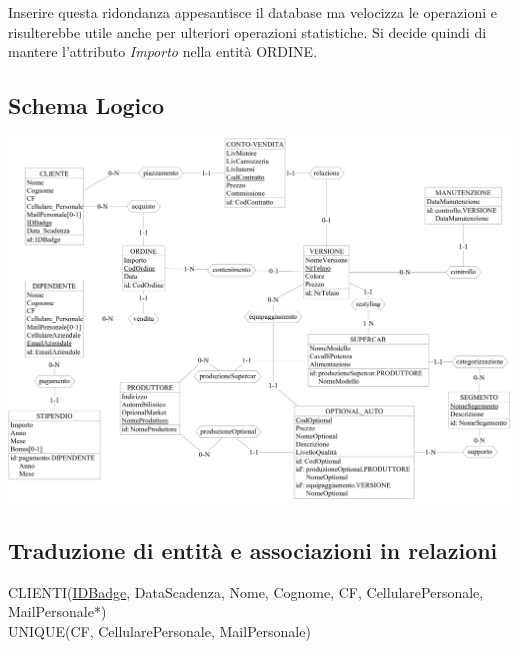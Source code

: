 \documentclass[11pt]{article}
\begin{document}
Inserire questa ridondanza appesantisce il database ma velocizza le operazioni e
risulterebbe utile anche per ulteriori operazioni statistiche. 
Si decide quindi di mantere l'attributo \textit{Importo} nella entità ORDINE.

\newpage

\subsection{Schema Logico}

\begin{center}
    \includegraphics[height=\linewidth, angle=90]{images/fullSchemes/logico.jpeg}
\end{center}

\newpage

\subsection{Traduzione di entità e associazioni in relazioni}

\small

\begin{flushleft}
CLIENTI(\underline{IDBadge}, DataScadenza, Nome, Cognome, CF,
    CellularePersonale, MailPersonale*)\\
UNIQUE(CF, CellularePersonale, MailPersonale)
\end{flushleft}
    
\end{document}
